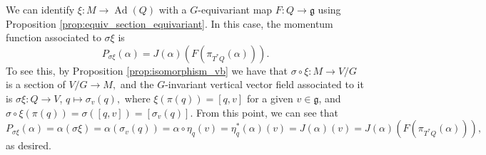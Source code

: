 \documentclass[12pt, letterpaper, reqno]{amsart}
\theoremstyle{definition}
\theoremstyle{plain}
\theoremstyle{remark}
\begin{document}
We can identify $ \xi: M \rightarrow \operatorname{Ad} (Q) $ with a $ G $-equivariant map $ F: Q \rightarrow \mathfrak{g} $ using Proposition \ref{prop:equiv_section_equivariant}. In this case, the momentum function associated to $ \sigma\xi $ is
$$ P_{\sigma\xi}(\alpha)= J(\alpha) \left( F(\pi_{T^*Q}(\alpha)) \right).  $$ 
To see this, by Proposition \ref{prop:isomorphism_vb} we have that $ \sigma\circ \xi: M \rightarrow V/G $ is a section of $ V/G \rightarrow M, $ and the $ G $-invariant vertical vector field associated to it is $ \sigma\xi: Q \rightarrow V $, $ q \mapsto \sigma_v(q), $ where $ \xi(\pi(q))=[q,v] $ for a given $ v\in \mathfrak{g} $, and $ \sigma\circ\xi(\pi(q)) = \sigma([q,v])=[\sigma_v(q)] $. From this point, we can see that $ P_{\sigma\xi}(\alpha) = \alpha(\sigma\xi) = \alpha(\sigma_v(q)) = \alpha\circ \eta_q(v) = \eta_q^*(\alpha)(v) = J(\alpha)(v)= J(\alpha) \left( F(\pi_{T^*Q}(\alpha)) \right), $ as desired.    
\end{document}
